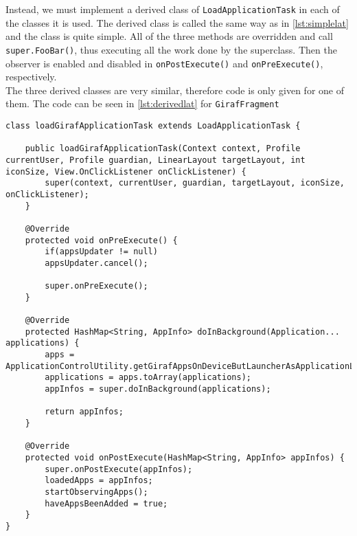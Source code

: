  Instead, we must implement a derived class of \lstinline|LoadApplicationTask| in each of the classes it is used.
 The derived class is called the same way as in \cref{lst:simplelat} and the class is quite simple.
 All of the three methods are overridden and call \lstinline!super.FooBar()!, thus executing all the work done by the superclass.
 Then the observer is enabled and disabled in  \lstinline!onPostExecute()! and \lstinline!onPreExecute()!, respectively.\\
 
 The three derived classes are very similar, therefore code is only given for one of them.
 The code can be seen in \cref{lst:derivedlat} for \lstinline!GirafFragment! 
 
  \begin{lstlisting}[caption={The loadGirafApplicationTask, derived from LoadApplicationTask. This is the derived class used by GirafFragment to load applications into view. Please note that all comments have been removed to make the listing smaller}, label={lst:derivedlat}]
class loadGirafApplicationTask extends LoadApplicationTask {

	public loadGirafApplicationTask(Context context, Profile currentUser, Profile guardian, LinearLayout targetLayout, int iconSize, View.OnClickListener onClickListener) {
		super(context, currentUser, guardian, targetLayout, iconSize, onClickListener);
	}
	
	@Override
	protected void onPreExecute() {
		if(appsUpdater != null)
		appsUpdater.cancel();
		
		super.onPreExecute();
	}
	
	@Override
	protected HashMap<String, AppInfo> doInBackground(Application... applications) {
		apps = ApplicationControlUtility.getGirafAppsOnDeviceButLauncherAsApplicationList(context);
		applications = apps.toArray(applications);
		appInfos = super.doInBackground(applications);
		
		return appInfos;
	}
	
	@Override
	protected void onPostExecute(HashMap<String, AppInfo> appInfos) {
		super.onPostExecute(appInfos);
		loadedApps = appInfos;
		startObservingApps();
		haveAppsBeenAdded = true;
	}
}
\end{lstlisting}